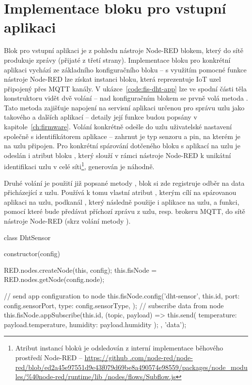 \section{Implementace bloku pro vstupní aplikaci}\label{sec:implementace-bloku-pro-vstupni-aplikaci}
Blok pro vstupní aplikaci je z pohledu nástroje Node-RED blokem, který do sítě produkuje zprávy (přijaté z třetí
strany).
Implementace bloku pro konkrétní aplikaci vychází ze základního konfiguračního bloku -- s využitím pomocné funkce
nástroje Node-RED  lze získat instanci bloku, která reprezentuje IoT uzel připojený přes MQTT
kanály.
V ukázce~\ref{code:fis-dht-app} lze ve spodní části těla konstruktoru vidět dvě volání -- nad konfiguračním blokem se
prvně volá metoda .
Tato metoda zajišťuje napojení na servisní aplikaci určenou pro správu uzlu jako takového a dalších aplikací --
detaily její funkce budou popsány v kapitole~\ref{ch:firmware}.
Volání konkrétně odešle do uzlu uživatelské nastavení společně s identifikátorem aplikace  -- zahrnut
je typ senzoru a pin, na kterém je na uzlu připojen.
Pro konkrétní spárování dotčeného bloku s aplikací na uzlu je odeslán i atribut bloku , který slouží v
rámci nástroje Node-RED k unikátní identifikaci uzlu v celé síti\footnote{Atribut  instancí bloků je
odsledován z interní implementace běhového prostředí Node-RED -- \url{https://github
.com/node-red/node-red/blob/ed2a45e97551d9e43f079d69be8a490574e98559/packages/node_modules/\%40node-red/runtime/lib
/nodes/flows/Subflow.js}}, generován je náhodně.

Druhé volání je použití již popsané metody , blok si zde registruje odběr na data přicházející z
uzlu.
Používá k tomu vlastní atribut , kterým cílí na spárovanou aplikaci na uzlu, podkanál , který
následně použije i aplikace na uzlu, a funkci, pomocí které bude předávat příchozí zprávu z uzlu, resp. brokeru MQTT,
do sítě nástroje Node-RED (skrz volání metody ).

\begin{code}[
    language=Javascript,
    label=code:fis-dht-app,
    caption={Detail implementace vstupní aplikace (z hlediska centrálního uzlu) -- konkrétně se jedná o aplikaci pro
    senzory typu DHT měřící teplotu a vlhkost okolí. }
]
class DhtSensor {
    constructor(config) {
        RED.nodes.createNode(this, config);
        this.fisNode = RED.nodes.getNode(config.node);

        // send app configuration to node
        this.fisNode.config('dht-sensor', this.id, {
            port: config.sensorPort,
            type: config.sensorType,
        });
        // subscribe data from node
        this.fisNode.appSubscribe(this.id, (topic, payload) => {
            this.send({
                temperature: payload.temperature,
                humidity: payload.humidity
            });
        }, 'data');
    }
}
\end{code}

